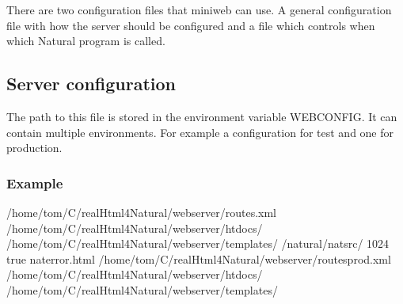 \documentclass[letterpaper,10pt,english]{sphinxmanual}
\begin{document}
There are two configuration files that miniweb can use. A general configuration file with how the server should be configured and a file which controls when which Natural program is called.


\subsection{Server configuration}
\label{\detokenize{webserver:server-configuration}}\label{\detokenize{webserver:webserver-config}}
The path to this file is stored in the environment variable \sphinxquotedblleft{}WEBCONFIG\sphinxquotedblright{}. It can contain multiple environments. For example a configuration for test and one for production.


\subsubsection{Example}
\label{\detokenize{webserver:example}}
\begin{sphinxVerbatim}[commandchars=\\\{\}]
     
        /home/tom/C/realHtml4Natural/web\PYGZus{}server/routes.xml
        /home/tom/C/realHtml4Natural/web\PYGZus{}server/htdocs/
        /home/tom/C/realHtml4Natural/web\PYGZus{}server/templates/
        /natural/natsrc/
        1024
        true
        nat\PYGZus{}error.html
     
        /home/tom/C/realHtml4Natural/web\PYGZus{}server/routes\PYGZus{}prod.xml
        /home/tom/C/realHtml4Natural/web\PYGZus{}server/htdocs/
        /home/tom/C/realHtml4Natural/web\PYGZus{}server/templates/
\end{sphinxVerbatim}
\end{document}

